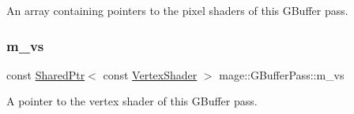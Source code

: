 An array containing pointers to the pixel shaders of this G\+Buffer pass. \hypertarget{classmage_1_1_g_buffer_pass_a5baced2ca3d5018e35d25d6c1b5d8f20}{}\label{classmage_1_1_g_buffer_pass_a5baced2ca3d5018e35d25d6c1b5d8f20} 
\subsubsection{\texorpdfstring{m\+\_\+vs}{m\_vs}}
{\footnotesize\ttfamily const \hyperlink{namespacemage_a1e01ae66713838a7a67d30e44c67703e}{Shared\+Ptr}$<$ const \hyperlink{classmage_1_1_vertex_shader}{Vertex\+Shader} $>$ mage\+::\+G\+Buffer\+Pass\+::m\+\_\+vs\hspace{0.3cm}{\ttfamily [private]}}

A pointer to the vertex shader of this G\+Buffer pass. 